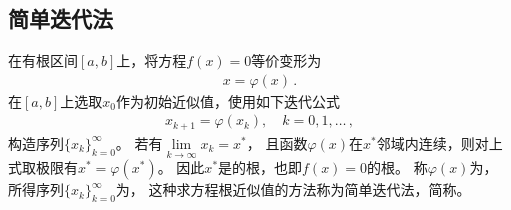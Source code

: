 \subsection{简单迭代法}\label{sub:简单迭代法}
\begin{definition}
    在有根区间$[a,b]$上，将方程$f(x)=0$等价变形为
    \begin{align}\label{eq:02ex0306}
        x=\varphi(x)\, .
    \end{align}
    在$[a,b]$上选取$x_0$作为初始近似值，使用如下迭代公式
    \begin{align}\label{eq:02ex0307}
        x_{k+1}=\varphi(x_k),\quad k=0,1,\ldots\, ,
    \end{align}
    构造序列$\{x_k\}_{k=0}^\infty$。
    若有$\displaystyle\lim\limits_{k\rightarrow\infty}{x_k}=x^*$，
    且函数$\varphi(x)$在$x^*$邻域内连续，则对上式取极限有$x^*=\varphi(x^*)$。
    因此$x^*$是的根，也即$f(x)=0$的根。
    称$\varphi(x)$为，
    所得序列$\{x_k\}_{k=0}^\infty$为，
    这种求方程根近似值的方法称为简单迭代法，简称。
\end{definition}

